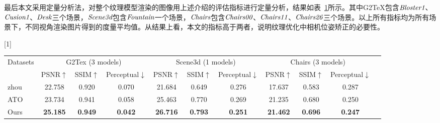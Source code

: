 最后本文采用定量分析法，对整个纹理模型渲染的图像用上述介绍的评估指标进行定量分析，结果如表~\ref{tab:evluation_ex2}所示。其中G2TeX包含$\emph{Bloster1}$、$\emph{Cusion1}$、$\emph{Desk}$三个场景，$\emph{Scene3d}$包含$\emph{Fountain}$一个场景，$\emph{Chairs}$包含$\emph{Chairs00}$、$\emph{Chairs11}$、$\emph{Chairs26}$三个场景。以上所有指标均为所有场景下，不同视角渲染图片得到的度量平均值。从结果上看，本文的指标高于两者，说明纹理优化中相机位姿矫正的必要性。

\begin{table}[ht]
\renewcommand{\arraystretch}{1.3}

\label{tab:evluation_ex2}
	\centering
    \scalebox{0.9}[1]{
		\begin{tabular}{lcccccccccc}
            \hline
			{Datasets} & \multicolumn{3}{c}{G2Tex (3 models)}  &\multicolumn{3}{c}{Scene3d (1 models)} & \multicolumn{3}{c}{Chairs (3 models)}\\
			{} & PSNR$\uparrow$ & SSIM$\uparrow$ & Perceptual$\downarrow$ & PSNR$\uparrow$  & SSIM$\uparrow$ & Perceptual$\downarrow$ & PSNR$\uparrow$ & SSIM$\uparrow$ & Perceptual$\downarrow$ \\
			\hline
			zhou & 22.758 & 0.920 & 0.070 & 21.684 & 0.649 & 0.276 & 17.637 & 0.583 & 0.287 \\
			ATO & 23.734 & 0.941 & 0.058 & 25.463 & 0.770 & 0.269 & 21.235 & 0.680 & 0.250 \\
			Ours & \textbf{25.185} & \textbf{0.949} & \textbf{0.042} & \textbf{26.716} & \textbf{0.793} & \textbf{0.251} & \textbf{21.462} & \textbf{0.696} & \textbf{0.247} \\
            \hline
		\end{tabular}
		}
	\normalsize
\end{table}

%
